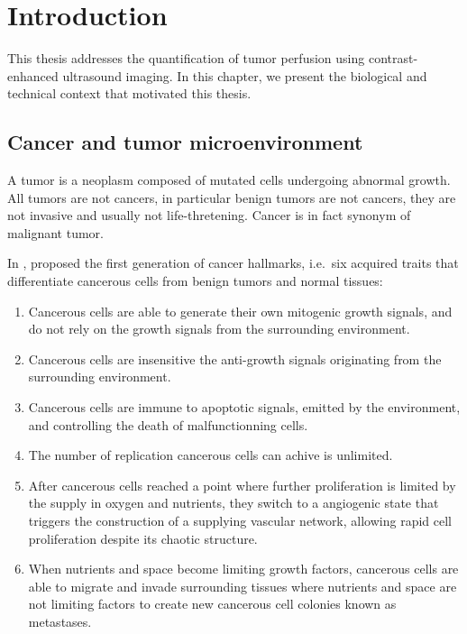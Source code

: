 \chapter{Introduction}\label{chapter:intro}
This thesis addresses the quantification of tumor perfusion using contrast-enhanced ultrasound imaging.
In this chapter, we present the biological and technical context that motivated this thesis.

\section{Cancer and tumor microenvironment}
\label{sec:IntroCancer}
A tumor is a neoplasm composed of mutated cells undergoing abnormal growth.
All tumors are not cancers, in particular benign tumors are not cancers, they are not invasive and usually not life-thretening.
Cancer is in fact synonym of malignant tumor.

In \citeyear{Hanahan:2000hx}, \citet{Hanahan:2000hx} proposed the first generation of cancer hallmarks, i.e.~six acquired traits that differentiate cancerous cells from benign tumors and normal tissues:
\begin{enumerate}
    \item Cancerous cells are able to generate their own mitogenic growth signals, and do not rely on the growth signals from the surrounding environment.
    \item Cancerous cells are insensitive the anti-growth signals originating from the surrounding environment.
    \item Cancerous cells are immune to apoptotic signals, emitted by the environment, and controlling the death of malfunctionning cells.
    \item The number of replication cancerous cells can achive is unlimited.
    \item After cancerous cells reached a point where further proliferation is limited by the supply in oxygen and nutrients, they switch to a angiogenic state that triggers the construction of a supplying vascular network, allowing rapid cell proliferation despite its chaotic structure.
    \item When nutrients and space become limiting growth factors, cancerous cells are able to migrate and invade surrounding tissues where nutrients and space are not limiting factors to create new cancerous cell colonies known as metastases.
\end{enumerate}

